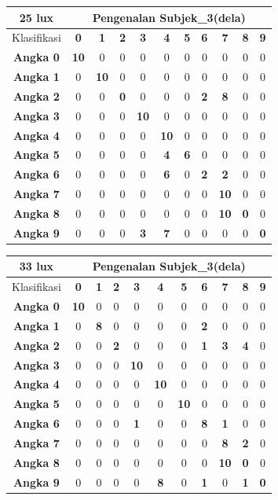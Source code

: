 \begin{tabular}{|c|c|c|c|c|c|c|c|c|c|c|}
	\hline 25 lux
	& \multicolumn{10}{|c|}{Pengenalan Subjek\_3(dela)} \\
	\hline  Klasifikasi&\textbf{0} &\textbf{1} &\textbf{2} &\textbf{3} &\textbf{4}&\textbf{5} &\textbf{6}&\textbf{7}&\textbf{8}&\textbf{9}\\
	\hline \textbf{Angka 0} &\textbf{10} &0 &0 &0&0&0&0&0&0&0\\
	\hline \textbf{Angka 1} &0 &\textbf{10} &0 &0&0&0&0&0&0&0\\
	\hline \textbf{Angka 2} &0 &0 &\textbf{0} &0 &0&0 &\textbf{2}&\textbf{8}&0&0\\
	\hline \textbf{Angka 3} &0 &0 &0 &\textbf{10} &0&0 &0&0&0&0\\
	\hline \textbf{Angka 4} &0 &0 &0 &0 &\textbf{10}&0&0&0&0&0\\
	\hline \textbf{Angka 5} &0 &0 &0 &0 &\textbf{4} &\textbf{6}&0&0&0&0\\
	\hline \textbf{Angka 6} &0 &0 &0 &0 &\textbf{6} &0&\textbf{2}&\textbf{2}&0&0\\
	\hline \textbf{Angka 7} &0 &0 &0 &0 &0 &0&0&\textbf{10}&0&0\\
	\hline \textbf{Angka 8} &0 &0 &0 &0&0&0&0&\textbf{10}&\textbf{0}&0 \\
	\hline \textbf{Angka 9} &0 &0 &0 &\textbf{3}&\textbf{7}&0&0&0&0&\textbf{0} \\
	\hline
\end{tabular}

\begin{tabular}{|c|c|c|c|c|c|c|c|c|c|c|}
	\hline 33 lux
	& \multicolumn{10}{|c|}{Pengenalan Subjek\_3(dela)} \\
	\hline  Klasifikasi&\textbf{0} &\textbf{1} &\textbf{2} &\textbf{3} &\textbf{4}&\textbf{5} &\textbf{6}&\textbf{7}&\textbf{8}&\textbf{9}\\
	\hline \textbf{Angka 0} &\textbf{10} &0 &0 &0&0&0&0&0&0&0\\
	\hline \textbf{Angka 1} &0 &\textbf{8} &0 &0&0&0&\textbf{2}&0&0&0\\
	\hline \textbf{Angka 2} &0 &0 &\textbf{2} &0 &0&0 &\textbf{1}&\textbf{3}&\textbf{4}&0\\
	\hline \textbf{Angka 3} &0 &0 &0 &\textbf{10} &0&0 &0&0&0&0\\
	\hline \textbf{Angka 4} &0 &0 &0 &0 &\textbf{10}&0&0&0&0&0\\
	\hline \textbf{Angka 5} &0 &0 &0 &0 &0 &\textbf{10}&0&0&0&0\\
	\hline \textbf{Angka 6} &0 &0 &0 &\textbf{1} &0 &0&\textbf{8}&\textbf{1}&0&0\\
	\hline \textbf{Angka 7} &0 &0 &0 &0 &0 &0&0&\textbf{8}&\textbf{2}&0\\
	\hline \textbf{Angka 8} &0 &0 &0 &0&0&0&0&\textbf{10}&\textbf{0}&0 \\
	\hline \textbf{Angka 9} &0 &0 &0 &0&\textbf{8}&0&\textbf{1}&0&\textbf{1}&\textbf{0} \\
	\hline
\end{tabular}

